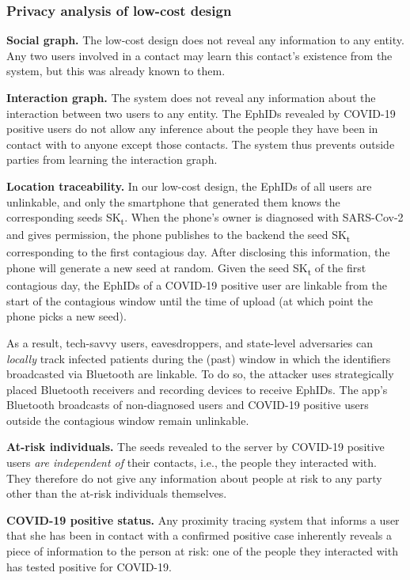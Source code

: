 \documentclass{article}
\begin{document}
\subsubsection{Privacy analysis of low-cost
design}\label{privacy-analysis-of-low-cost-design}

\textbf{Social graph.} The low-cost design does not reveal any
information to any entity. Any two users involved in a contact may learn
this contact's existence from the system, but this was already known to
them.

\textbf{Interaction graph.} The system does not reveal any information
about the interaction between two users to any entity. The EphIDs
revealed by COVID-19 positive users do not allow any inference about the
people they have been in contact with to anyone except those contacts.
The system thus prevents outside parties from learning the interaction
graph.

\textbf{Location traceability.} In our low-cost design, the EphIDs of
all users are unlinkable, and only the smartphone that generated them
knows the corresponding seeds SK\textsubscript{t}. When the phone's
owner is diagnosed with SARS-Cov-2 and gives permission, the phone
publishes to the backend the seed SK\textsubscript{t} corresponding to
the first contagious day. After disclosing this information, the phone
will generate a new seed at random. Given the seed SK\textsubscript{t}
of the first contagious day, the EphIDs of a COVID-19 positive user are
linkable from the start of the contagious window until the time of
upload (at which point the phone picks a new seed).

As a result, tech-savvy users, eavesdroppers, and state-level
adversaries can \emph{locally} track infected patients during the (past)
window in which the identifiers broadcasted via Bluetooth are linkable.
To do so, the attacker uses strategically placed Bluetooth receivers and
recording devices to receive EphIDs. The app's Bluetooth broadcasts of
non-diagnosed users and COVID-19 positive users outside the contagious
window remain unlinkable.

\textbf{At-risk individuals.} The seeds revealed to the server by
COVID-19 positive users \emph{are independent of} their contacts, i.e.,
the people they interacted with. They therefore do not give any
information about people at risk to any party other than the at-risk
individuals themselves.

\textbf{COVID-19 positive status.} Any proximity tracing system that
informs a user that she has been in contact with a confirmed positive
case inherently reveals a piece of information to the person at risk:
one of the people they interacted with has tested positive for COVID-19.
\end{document}

